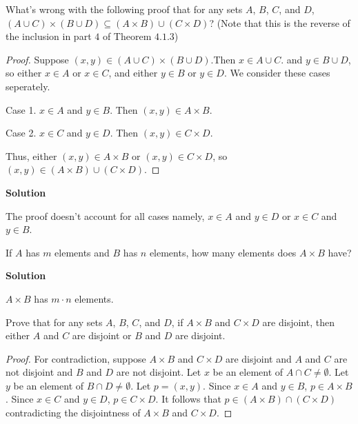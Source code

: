 \begin{tcolorbox}[title=Problem 6, breakable]
    What's wrong with the following proof that for any sets $A$, $B$, $C$, and $D$,
    $(A \cup C) \times (B \cup D) \subseteq (A \times B) \cup (C \times D)$?
    (Note that this is the reverse of the inclusion in part $4$ of Theorem $4.1.3$)

    \begin{proof}
        Suppose $(x, y) \in (A \cup C) \times (B \cup D)$.Then $x \in A \cup C$.
        and $y \in B \cup D$, so either $x \in A$ or $x \in C$, 
        and either $y \in B$ or $y \in D$. We consider these cases seperately.

        Case 1. $x \in A$ and $y \in B$. Then $(x, y) \in A \times B$.

        Case 2. $x \in C$ and $y \in D$. Then $(x, y) \in C \times D$.

        Thus, either $(x, y) \in A \times B$ or $(x, y) \in C \times D$, so $(x, y) \in
            (A \times B) \cup (C \times D)$.
    \end{proof}
\end{tcolorbox}

\textbf{Solution}

The proof doesn't account for all cases namely, $x \in A$ and $y \in D$ or $x
    \in C$ and $y \in B$.

\begin{tcolorbox}[title=Problem 7, breakable]
    If $A$ has $m$ elements and $B$ has $n$ elements, how many elements does $A \times B$ have?
\end{tcolorbox}

\textbf{Solution}

$A \times B$ has $m \cdot n$ elements.

\begin{tcolorbox}[title=Problem 12, breakable]
    Prove that for any sets $A$, $B$, $C$, and $D$, if $A \times B$ and $C \times D$ are disjoint,
    then either $A$ and $C$ are disjoint or $B$ and $D$ are disjoint.
\end{tcolorbox}

\begin{proof}
    For contradiction, suppose $A \times B$ and $C \times D$ are disjoint
    and $A$ and $C$ are not disjoint and $B$ and $D$ are not disjoint.
    Let $x$ be an element of $A \cap C \not= \emptyset$.
    Let $y$ be an element of $B \cap D \not= \emptyset$.
    Let $p = (x, y)$. Since $x \in A$ and $y \in B$, $p \in A \times B$.
    Since $x \in C$ and $y \in D$, $p \in C \times D$.
    It follows that $p \in (A \times B) \cap (C \times D)$ contradicting the disjointness of $A \times B$ and $C \times D$.
\end{proof}

